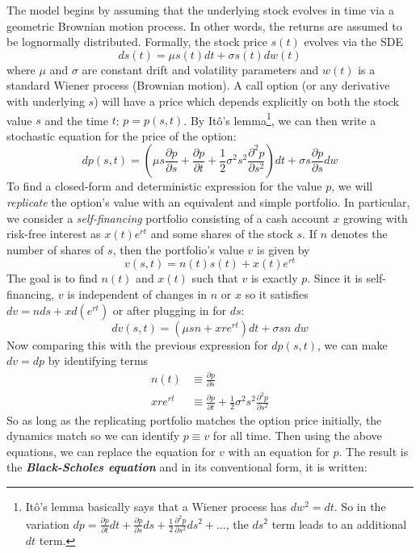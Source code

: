 \documentclass[10pt,a4paper,twocolumn]{article}
\newcommand\bemph[1]{\textbf{\emph{#1}}}
\begin{document}
	The model begins by assuming that the underlying stock evolves in time via a geometric Brownian motion process. In other words, the returns are assumed to be lognormally distributed. Formally, the stock price $s(t)$ evolves via the SDE
	$$ds(t) = \mu s(t) dt + \sigma s(t) dw(t)$$
	where $\mu$ and $\sigma$ are constant drift and volatility parameters and $w(t)$ is a standard Wiener process (Brownian motion). A call option (or any derivative with underlying $s$) will have a price which depends explicitly on both the stock value $s$ and the time $t$: $p=p(s, t)$. By It\^{o}'s lemma\footnote{It\^{o}'s lemma basically says that a Wiener process has $dw^2=dt$. So in the variation $dp = \frac{\partial p}{\partial t}dt + \frac{\partial p}{\partial s} ds + \frac{1}{2}\frac{\partial^2p}{\partial s^2}ds^2 + \dots$, the $ds^2$ term leads to an additional $dt$ term.}, we can then write a stochastic equation for the price of the option:
	$$ dp(s,t) = \left(\mu s \frac{\partial p}{\partial s} + \frac{\partial p}{\partial t} + \frac{1}{2}\sigma^2 s^2 \frac{\partial^2 p}{\partial s^2}\right)dt + \sigma s\frac{\partial p}{\partial s} dw $$
	To find a closed-form and deterministic expression for the value $p$, we will \emph{replicate} the option's value with an equivalent and simple portfolio. In particular, we consider a \emph{self-financing} portfolio consisting of a cash account $x$ growing with risk-free interest as $x(t)e^{rt}$ and some shares of the stock $s$. If $n$ denotes the number of shares of $s$, then the portfolio's value $v$ is given by
	$$ v(s,t) = n(t)s(t) + x(t)e^{rt} $$
	The goal is to find $n(t)$ and $x(t)$ such that $v$ is exactly $p$. Since it is self-financing, $v$ is independent of changes in $n$ or $x$ so  it satisfies $dv = nds + x d(e^{rt})$ or after plugging in for $ds$:
	$$ dv(s,t) = \left(\mu s n + x r e^{rt}\right)dt + \sigma s n\; dw $$
	Now comparing this with the previous expression for $dp(s,t)$, we can make $dv=dp$ by identifying terms
	\begin{align*}
		n(t)&\equiv \frac{\partial p}{\partial s} \\
		 x r e^{rt} &\equiv \frac{\partial p}{\partial t} + \frac{1}{2}\sigma^2 s^2 \frac{\partial^2 p}{\partial s^2}
	\end{align*}
	So as long as the replicating portfolio matches the option price initially, the dynamics match so we can identify $p\equiv v$ for all time. Then using the above equations, we can replace the equation for $v$ with an equation for $p$. The result is the \bemph{Black-Scholes equation} and in its conventional form, it is written:
\end{document}
